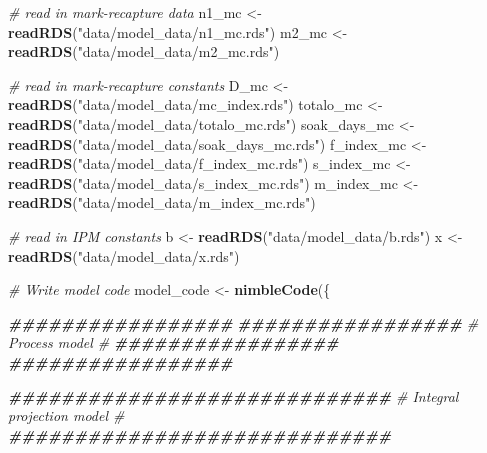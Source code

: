 \documentclass[
]{article}
\newenvironment{Shaded}{\begin{snugshade}}{\end{snugshade}}
\newcommand{\CommentTok}[1]{\textcolor[rgb]{0.56,0.35,0.01}{\textit{#1}}}
\newcommand{\DocumentationTok}[1]{\textcolor[rgb]{0.56,0.35,0.01}{\textbf{\textit{#1}}}}
\newcommand{\FunctionTok}[1]{\textcolor[rgb]{0.13,0.29,0.53}{\textbf{#1}}}
\newcommand{\NormalTok}[1]{#1}
\newcommand{\OtherTok}[1]{\textcolor[rgb]{0.56,0.35,0.01}{#1}}
\newcommand{\StringTok}[1]{\textcolor[rgb]{0.31,0.60,0.02}{#1}}
\begin{document}
\begin{Shaded}
\begin{Highlighting}[]
\CommentTok{\# read in mark{-}recapture data}
\NormalTok{n1\_mc }\OtherTok{\textless{}{-}} \FunctionTok{readRDS}\NormalTok{(}\StringTok{"data/model\_data/n1\_mc.rds"}\NormalTok{)}
\NormalTok{m2\_mc }\OtherTok{\textless{}{-}} \FunctionTok{readRDS}\NormalTok{(}\StringTok{"data/model\_data/m2\_mc.rds"}\NormalTok{)}

\CommentTok{\# read in mark{-}recapture constants}
\NormalTok{D\_mc }\OtherTok{\textless{}{-}} \FunctionTok{readRDS}\NormalTok{(}\StringTok{"data/model\_data/mc\_index.rds"}\NormalTok{)}
\NormalTok{totalo\_mc }\OtherTok{\textless{}{-}} \FunctionTok{readRDS}\NormalTok{(}\StringTok{"data/model\_data/totalo\_mc.rds"}\NormalTok{)}
\NormalTok{soak\_days\_mc }\OtherTok{\textless{}{-}} \FunctionTok{readRDS}\NormalTok{(}\StringTok{"data/model\_data/soak\_days\_mc.rds"}\NormalTok{)}
\NormalTok{f\_index\_mc }\OtherTok{\textless{}{-}} \FunctionTok{readRDS}\NormalTok{(}\StringTok{"data/model\_data/f\_index\_mc.rds"}\NormalTok{)}
\NormalTok{s\_index\_mc }\OtherTok{\textless{}{-}} \FunctionTok{readRDS}\NormalTok{(}\StringTok{"data/model\_data/s\_index\_mc.rds"}\NormalTok{)}
\NormalTok{m\_index\_mc }\OtherTok{\textless{}{-}} \FunctionTok{readRDS}\NormalTok{(}\StringTok{"data/model\_data/m\_index\_mc.rds"}\NormalTok{)}

\CommentTok{\# read in IPM constants}
\NormalTok{b }\OtherTok{\textless{}{-}} \FunctionTok{readRDS}\NormalTok{(}\StringTok{"data/model\_data/b.rds"}\NormalTok{)}
\NormalTok{x }\OtherTok{\textless{}{-}} \FunctionTok{readRDS}\NormalTok{(}\StringTok{"data/model\_data/x.rds"}\NormalTok{)}


\CommentTok{\# Write model code}
\NormalTok{model\_code }\OtherTok{\textless{}{-}} \FunctionTok{nimbleCode}\NormalTok{(\{}
  
  \DocumentationTok{\#\#\#\#\#\#\#\#\#\#\#\#\#\#\#\#\#}
  \DocumentationTok{\#\#\#\#\#\#\#\#\#\#\#\#\#\#\#\#\#}
  \CommentTok{\# Process model \#}
  \DocumentationTok{\#\#\#\#\#\#\#\#\#\#\#\#\#\#\#\#\#}
  \DocumentationTok{\#\#\#\#\#\#\#\#\#\#\#\#\#\#\#\#\#}
  
  \DocumentationTok{\#\#\#\#\#\#\#\#\#\#\#\#\#\#\#\#\#\#\#\#\#\#\#\#\#\#\#\#\#}
  \CommentTok{\# Integral projection model \#}
  \DocumentationTok{\#\#\#\#\#\#\#\#\#\#\#\#\#\#\#\#\#\#\#\#\#\#\#\#\#\#\#\#\#}
  

\end{Highlighting}
\end{Shaded}
\end{document}
